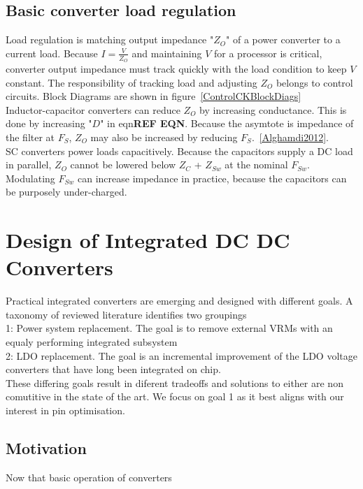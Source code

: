 \documentclass[letterpaper,twocolumn,10pt]{article}
\begin{document}
\subsection{Basic converter load regulation}
Load regulation is matching output impedance "$Z_O$" of a power converter to a current load. Because $I= \frac{V}{Z_O}$ and maintaining $V$ for a processor is critical, converter output impedance must track quickly with the load condition to keep $V$ constant. The responsibility of tracking load and adjusting $Z_O$ belongs to control circuits. Block Diagrams are shown in figure~\ref{ControlCKBlockDiags}\\
Inductor-capacitor converters can reduce $Z_O$ by increasing conductance. This is done by increasing "$D$" in eqn\textbf{REF EQN}. Because the asymtote is impedance of the filter at $F_S$, $Z_O$ may also be increased by reducing $F_S$.~\ref{Alghamdi2012}.\\ %
SC converters power loads capacitively. Because the capacitors supply a DC load in parallel, $Z_O$ cannot be lowered below $Z_C$ + $Z_{Sw}$ at the nominal $F_{Sw}$. Modulating $F_{Sw}$ can increase impedance in practice, because the capacitors can be purposely under-charged.\\

\section{Design of Integrated DC DC Converters}

Practical integrated converters are emerging and designed with different goals. A taxonomy of reviewed literature identifies two groupings\\
1: Power system replacement. The goal is to remove external VRMs with an equaly performing integrated subsystem\\
2: LDO replacement. The goal is an incremental improvement of the LDO voltage converters that have long been integrated on chip.\\
These differing goals result in diferent tradeoffs and solutions to either are non comutitive in the state of the art. We focus on goal 1 as it best aligns with our interest in pin optimisation.\\  

\subsection{Motivation}
Now that basic operation of converters 
\end{document}
